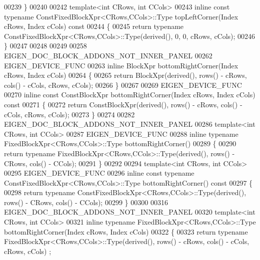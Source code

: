 \begin{DoxyCode}
00239 \}
00240 
00242 \textcolor{keyword}{template}<\textcolor{keywordtype}{int} CRows, \textcolor{keywordtype}{int} CCols>
00243 \textcolor{keyword}{inline} \textcolor{keyword}{const} \textcolor{keyword}{typename} ConstFixedBlockXpr<CRows,CCols>::Type topLeftCorner(Index cRows, Index cCols)\textcolor{keyword}{ const}
00244 \textcolor{keyword}{}\{
00245   \textcolor{keywordflow}{return} \textcolor{keyword}{typename} ConstFixedBlockXpr<CRows,CCols>::Type(derived(), 0, 0, cRows, cCols);
00246 \}
00247 
00248 
00249 
00258 EIGEN\_DOC\_BLOCK\_ADDONS\_NOT\_INNER\_PANEL
00262 EIGEN\_DEVICE\_FUNC
00263 \textcolor{keyword}{inline} BlockXpr bottomRightCorner(Index cRows, Index cCols)
00264 \{
00265   \textcolor{keywordflow}{return} BlockXpr(derived(), rows() - cRows, cols() - cCols, cRows, cCols);
00266 \}
00267 
00269 EIGEN\_DEVICE\_FUNC
00270 \textcolor{keyword}{inline} \textcolor{keyword}{const} ConstBlockXpr bottomRightCorner(Index cRows, Index cCols)\textcolor{keyword}{ const}
00271 \textcolor{keyword}{}\{
00272   \textcolor{keywordflow}{return} ConstBlockXpr(derived(), rows() - cRows, cols() - cCols, cRows, cCols);
00273 \}
00274 
00282 EIGEN\_DOC\_BLOCK\_ADDONS\_NOT\_INNER\_PANEL
00286 \textcolor{keyword}{template}<\textcolor{keywordtype}{int} CRows, \textcolor{keywordtype}{int} CCols>
00287 EIGEN\_DEVICE\_FUNC
00288 \textcolor{keyword}{inline} \textcolor{keyword}{typename} FixedBlockXpr<CRows,CCols>::Type bottomRightCorner()
00289 \{
00290   \textcolor{keywordflow}{return} \textcolor{keyword}{typename} FixedBlockXpr<CRows,CCols>::Type(derived(), rows() - CRows, cols() - CCols);
00291 \}
00292 
00294 \textcolor{keyword}{template}<\textcolor{keywordtype}{int} CRows, \textcolor{keywordtype}{int} CCols>
00295 EIGEN\_DEVICE\_FUNC
00296 \textcolor{keyword}{inline} \textcolor{keyword}{const} \textcolor{keyword}{typename} ConstFixedBlockXpr<CRows,CCols>::Type bottomRightCorner()\textcolor{keyword}{ const}
00297 \textcolor{keyword}{}\{
00298   \textcolor{keywordflow}{return} \textcolor{keyword}{typename} ConstFixedBlockXpr<CRows,CCols>::Type(derived(), rows() - CRows, cols() - CCols);
00299 \}
00300 
00316 EIGEN\_DOC\_BLOCK\_ADDONS\_NOT\_INNER\_PANEL
00320 \textcolor{keyword}{template}<\textcolor{keywordtype}{int} CRows, \textcolor{keywordtype}{int} CCols>
00321 \textcolor{keyword}{inline} \textcolor{keyword}{typename} FixedBlockXpr<CRows,CCols>::Type bottomRightCorner(Index cRows, Index cCols)
00322 \{
00323   \textcolor{keywordflow}{return} \textcolor{keyword}{typename} FixedBlockXpr<CRows,CCols>::Type(derived(), rows() - cRows, cols() - cCols, cRows, cCols)
      ;

\end{DoxyCode}
